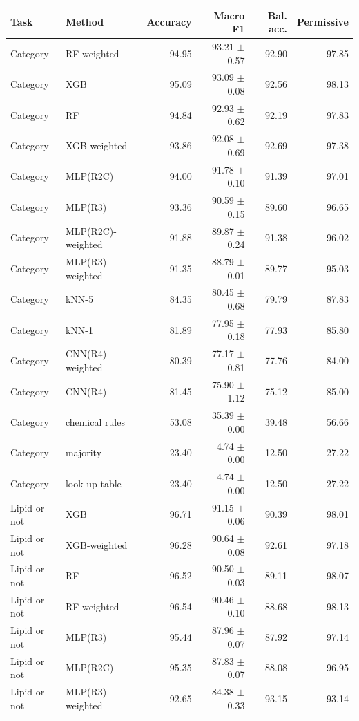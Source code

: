 \begin{tabular}{llrrrr}
\toprule
Task & Method & Accuracy & Macro F1 & Bal. acc. & Permissive \\
\midrule
Category & RF-weighted & 94.95 & 93.21 $\pm$ 0.57 & 92.90 & 97.85 \\
Category & XGB & 95.09 & 93.09 $\pm$ 0.08 & 92.56 & 98.13 \\
Category & RF & 94.84 & 92.93 $\pm$ 0.62 & 92.19 & 97.83 \\
Category & XGB-weighted & 93.86 & 92.08 $\pm$ 0.69 & 92.69 & 97.38 \\
Category & MLP(R2C) & 94.00 & 91.78 $\pm$ 0.10 & 91.39 & 97.01 \\
Category & MLP(R3) & 93.36 & 90.59 $\pm$ 0.15 & 89.60 & 96.65 \\
Category & MLP(R2C)-weighted & 91.88 & 89.87 $\pm$ 0.24 & 91.38 & 96.02 \\
Category & MLP(R3)-weighted & 91.35 & 88.79 $\pm$ 0.01 & 89.77 & 95.03 \\
Category & kNN-5 & 84.35 & 80.45 $\pm$ 0.68 & 79.79 & 87.83 \\
Category & kNN-1 & 81.89 & 77.95 $\pm$ 0.18 & 77.93 & 85.80 \\
Category & CNN(R4)-weighted & 80.39 & 77.17 $\pm$ 0.81 & 77.76 & 84.00 \\
Category & CNN(R4) & 81.45 & 75.90 $\pm$ 1.12 & 75.12 & 85.00 \\
Category & chemical rules & 53.08 & 35.39 $\pm$ 0.00 & 39.48 & 56.66 \\
Category & majority & 23.40 & 4.74 $\pm$ 0.00 & 12.50 & 27.22 \\
Category & look-up table & 23.40 & 4.74 $\pm$ 0.00 & 12.50 & 27.22 \\
Lipid or not & XGB & 96.71 & 91.15 $\pm$ 0.06 & 90.39 & 98.01 \\
Lipid or not & XGB-weighted & 96.28 & 90.64 $\pm$ 0.08 & 92.61 & 97.18 \\
Lipid or not & RF & 96.52 & 90.50 $\pm$ 0.03 & 89.11 & 98.07 \\
Lipid or not & RF-weighted & 96.54 & 90.46 $\pm$ 0.10 & 88.68 & 98.13 \\
Lipid or not & MLP(R3) & 95.44 & 87.96 $\pm$ 0.07 & 87.92 & 97.14 \\
Lipid or not & MLP(R2C) & 95.35 & 87.83 $\pm$ 0.07 & 88.08 & 96.95 \\
Lipid or not & MLP(R3)-weighted & 92.65 & 84.38 $\pm$ 0.33 & 93.15 & 93.14 \\

\end{tabular}
